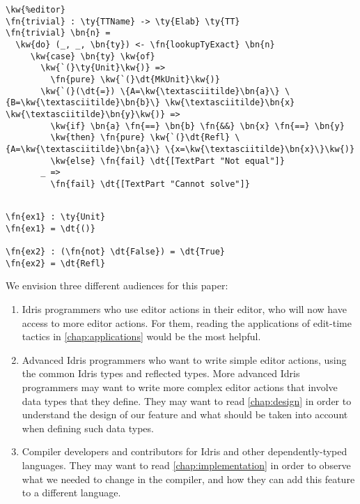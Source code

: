 \begin{Verbatim}
\kw{%editor}
\fn{trivial} : \ty{TTName} -> \ty{Elab} \ty{TT}
\fn{trivial} \bn{n} =
  \kw{do} (_, _, \bn{ty}) <- \fn{lookupTyExact} \bn{n}
     \kw{case} \bn{ty} \kw{of}
       \kw{`(}\ty{Unit}\kw{)} =>
         \fn{pure} \kw{`(}\dt{MkUnit}\kw{)}
       \kw{`(}(\dt{=}) \{A=\kw{\textasciitilde}\bn{a}\} \{B=\kw{\textasciitilde}\bn{b}\} \kw{\textasciitilde}\bn{x} \kw{\textasciitilde}\bn{y}\kw{)} =>
         \kw{if} \bn{a} \fn{==} \bn{b} \fn{&&} \bn{x} \fn{==} \bn{y}
         \kw{then} \fn{pure} \kw{`(}\dt{Refl} \{A=\kw{\textasciitilde}\bn{a}\} \{x=\kw{\textasciitilde}\bn{x}\}\kw{)}
         \kw{else} \fn{fail} \dt{[TextPart "Not equal"]}
       _ =>
         \fn{fail} \dt{[TextPart "Cannot solve"]}


\end{Verbatim}


\begin{Verbatim}
\fn{ex1} : \ty{Unit}
\fn{ex1} = \dt{()}

\fn{ex2} : (\fn{not} \dt{False}) = \dt{True}
\fn{ex2} = \dt{Refl}
\end{Verbatim}




We envision three different audiences for this paper:
\begin{enumerate}[(1)]
\item Idris programmers who use editor actions in their editor, who will now
  have access to more editor actions. For them, reading the applications of
edit-time tactics in \autoref{chap:applications} would be the most helpful.
\item Advanced Idris programmers who want to write simple editor actions, using
  the common Idris types and reflected types. More advanced Idris programmers
    may want to write more complex editor actions that involve data types
    that they define.
    They may want to read \autoref{chap:design} in order to understand the
    design of our feature and what should be taken into account when defining
    such data types.
\item Compiler developers and contributors for Idris and other
  dependently-typed languages.  They may want to read
    \autoref{chap:implementation} in order to observe what we needed to change
    in the compiler, and how they can add this feature to a different language.
\end{enumerate}
